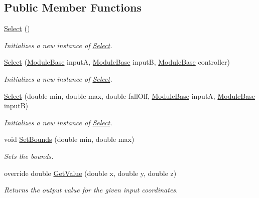 \subsection*{Public Member Functions}
\begin{DoxyCompactItemize}
\item 
\hyperlink{class_lib_noise_1_1_operator_1_1_select_acb4f276703eed6184d9c982d6670191b}{Select} ()
\begin{DoxyCompactList}\small\item\em Initializes a new instance of \hyperlink{class_lib_noise_1_1_operator_1_1_select}{Select}. \end{DoxyCompactList}\item 
\hyperlink{class_lib_noise_1_1_operator_1_1_select_a37dc6565fe49d63aa5bef700d58d615f}{Select} (\hyperlink{class_lib_noise_1_1_module_base}{Module\+Base} inputA, \hyperlink{class_lib_noise_1_1_module_base}{Module\+Base} inputB, \hyperlink{class_lib_noise_1_1_module_base}{Module\+Base} controller)
\begin{DoxyCompactList}\small\item\em Initializes a new instance of \hyperlink{class_lib_noise_1_1_operator_1_1_select}{Select}. \end{DoxyCompactList}\item 
\hyperlink{class_lib_noise_1_1_operator_1_1_select_a2a29c69bf154fd755d05f42429f020d5}{Select} (double min, double max, double fall\+Off, \hyperlink{class_lib_noise_1_1_module_base}{Module\+Base} inputA, \hyperlink{class_lib_noise_1_1_module_base}{Module\+Base} inputB)
\begin{DoxyCompactList}\small\item\em Initializes a new instance of \hyperlink{class_lib_noise_1_1_operator_1_1_select}{Select}. \end{DoxyCompactList}\item 
void \hyperlink{class_lib_noise_1_1_operator_1_1_select_a249d52efba7fa4cf33a9f64ff12b9887}{Set\+Bounds} (double min, double max)
\begin{DoxyCompactList}\small\item\em Sets the bounds. \end{DoxyCompactList}\item 
override double \hyperlink{class_lib_noise_1_1_operator_1_1_select_a16ab75303a00d00756fe9ec740184aef}{Get\+Value} (double x, double y, double z)
\begin{DoxyCompactList}\small\item\em Returns the output value for the given input coordinates. \end{DoxyCompactList}\end{DoxyCompactItemize}
